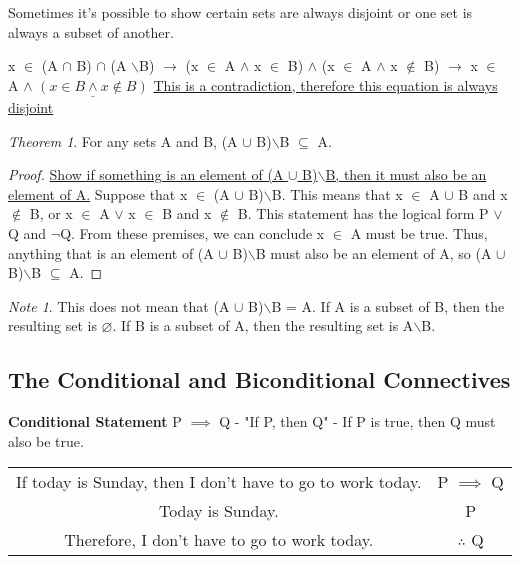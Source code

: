 \documentclass[11pt]{article}
\theoremstyle{definition}
\theoremstyle{remark}
\newtheorem{theorem}{Theorem}
\newtheorem{note}{Note}
\begin{document}
Sometimes it's possible to show certain sets are always disjoint or one set is always a subset of another.

x $\in$ (A $\cap$ B) $\cap$ (A $\backslash$B) $\longrightarrow$ (x $\in$ A $\land$ x $\in$ B) $\land$ (x $\in$ A $\land$ x $\notin$ B) $\longrightarrow$ 
x $\in$ A $\land$ $\underline{(x \in B \land x \notin B)}$ \underline{This is a contradiction, therefore this equation is
always disjoint}   
\\

\begin{theorem}
    For any sets A and B, (A $\cup$ B)$\backslash$B $\subseteq$ A.  
\end{theorem}
\begin{proof}
    \underline{Show if something is an element of (A $\cup$ B)$\backslash$B, then it must also be an element of A.} \newline \newline
    Suppose that x $\in$ (A $\cup$ B)$\backslash$B. This means that x $\in$ A $\cup$ B and x $\notin$ B, or x $\in$ A $\lor$ x $\in$ B and x $\notin$ B.
    This statement has the logical form P $\lor$ Q and $\neg$Q. From these premises, we can conclude x $\in$ A must be true.
    Thus, anything that is an element of (A $\cup$ B)$\backslash$B must also be an element of A, so (A $\cup$ B)$\backslash$B $\subseteq$ A.
\end{proof}

\begin{note}
    This does not mean that (A $\cup$ B)$\backslash$B = A. If A is a subset of B, then the resulting set is $\varnothing$.
    If B is a subset of A, then the resulting set is A$\backslash$B.
\end{note}

\subsection{The Conditional and Biconditional Connectives}
\begin{shaded}
\textbf{Conditional Statement} \newline
P $\implies$ Q - "If P, then Q" - If P is true, then Q must also be true.
\end{shaded}

\begin{center}
\begin{tabular}{c|c}
                If today is Sunday, then I don't have to go to work today. &  P $\implies$ Q \\
                Today is Sunday. &  P \\
                \hline
                Therefore, I don't have to go to work today. & $\therefore$ Q  \\
\end{tabular}
\end{center}
\end{document}
